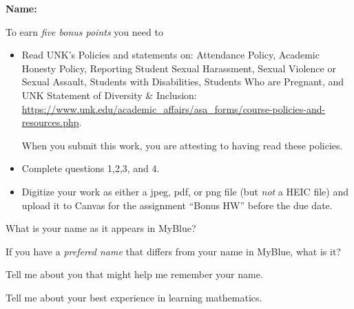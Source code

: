 \documentclass[12pt]{exam}
\newcommand\PM{{\sc pm}}
\newcommand{\quiz}{1}
\newcommand{\term}{Fall}
\newcommand{\due}{Friday 26 August  at 11:59 \PM}
\begin{document}
\large
\vspace{0.1in}
\noindent{}
{\bf Name:}  \\
\noindent \makebox[3.0truein][l]{\bf Bonus   \quiz, \term \/ \the\year}
\vspace{0.1in}


\vspace{0.1in}


\indent To earn \emph{five bonus points} you need to 

\begin{itemize}

    \item Read UNK's Policies and statements on: Attendance Policy, Academic Honesty Policy, Reporting Student Sexual Harassment, 
    Sexual Violence or Sexual Assault, Students with Disabilities, Students Who are Pregnant, and UNK Statement of Diversity \& Inclusion: 
     \small \url{https://www.unk.edu/academic_affairs/asa_forms/course-policies-and-resources.php}.
    
    \large
    When you submit this work, you are attesting to having read these
    policies.

    \item Complete questions 1,2,3, and 4.
    
    \item Digitize your work as either a jpeg, pdf, or png file (but \emph{not} a  HEIC file) and 
    upload it to Canvas for the assignment ``Bonus HW'' before the due date.

\end{itemize}

\begin{questions}  
    
\question What is your name as it appears in MyBlue?

\vspace{0.5in}


\question If you have a \emph{prefered name} that differs from your 
name in MyBlue, what is it?

\vspace{0.5in}


\question Tell me about you that might help me remember your name. 
\vspace{1.5in}

\question Tell me about your best experience in learning mathematics. 
\vspace{1.5in}




\end{questions}
\end{document}
